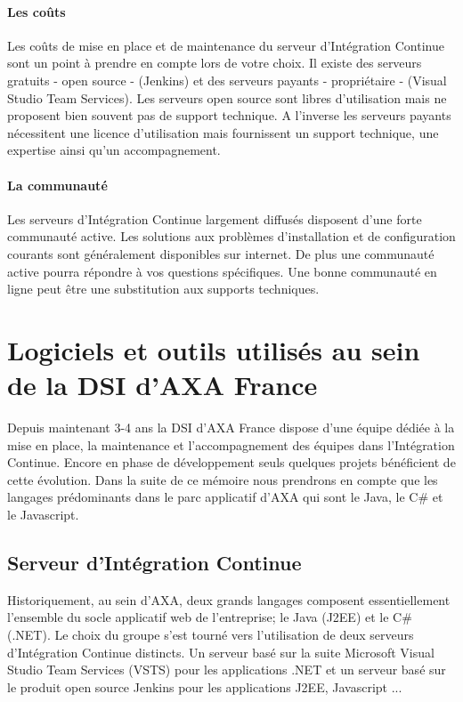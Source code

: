      \paragraph{Les coûts} Les coûts de mise en place et de maintenance du serveur d'Intégration Continue sont un point à prendre en compte lors de votre choix. Il existe des serveurs gratuits - open source - (Jenkins) et des serveurs payants - propriétaire - (Visual Studio Team Services). Les serveurs open source sont libres d'utilisation mais ne proposent bien souvent pas de support technique. A l'inverse les serveurs payants nécessitent une licence d'utilisation mais fournissent un support technique, une expertise ainsi qu'un accompagnement.

      \paragraph{La communauté} Les serveurs d'Intégration Continue largement diffusés disposent d'une forte communauté active. Les solutions aux problèmes d'installation et de configuration courants sont généralement disponibles sur internet. De plus une communauté active pourra répondre à vos questions spécifiques. Une bonne communauté en ligne peut être une substitution aux supports techniques.

  \section{Logiciels et outils utilisés au sein de la DSI d'AXA France}
  Depuis maintenant 3-4 ans la DSI d'AXA France dispose d'une équipe dédiée à la mise en place, la maintenance et l'accompagnement des équipes dans l'Intégration Continue. Encore en phase de développement seuls quelques projets bénéficient de cette évolution. Dans la suite de ce mémoire nous prendrons en compte que les langages prédominants dans le parc applicatif d'AXA qui sont le Java, le C\# et le Javascript.

    \subsection{Serveur d’Intégration Continue}
    Historiquement, au sein d'AXA, deux grands langages composent essentiellement l'ensemble du socle applicatif web de l'entreprise; le Java (J2EE) et le C\# (.NET). Le choix du groupe s'est tourné vers l'utilisation de deux serveurs d'Intégration Continue distincts. Un serveur basé sur la suite Microsoft Visual Studio Team Services (VSTS) pour les applications .NET et un serveur basé sur le produit open source Jenkins pour les applications J2EE, Javascript ...\\

